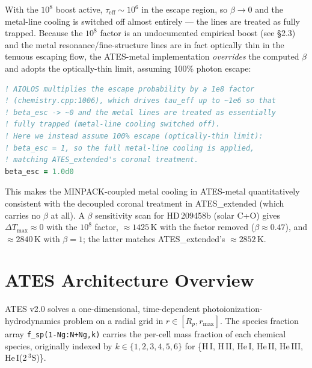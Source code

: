 \documentclass[english,a4paper]{kiseon_memo}
\begin{document}
With the \(10^{8}\) boost active, \(\tau_\mathrm{eff}\sim 10^{6}\) in the
escape region, so \(\beta\to 0\) and the metal-line cooling is switched
off almost entirely --- the lines are treated as fully trapped.  Because
the \(10^{8}\) factor is an undocumented empirical boost (see \S2.3) and
the metal resonance/fine-structure lines are in fact optically thin in
the tenuous escaping flow, the ATES-metal implementation
\emph{overrides} the computed \(\beta\) and adopts the optically-thin
limit, assuming 100\% photon escape:
\begin{lstlisting}[language=Fortran]
! AIOLOS multiplies the escape probability by a 1e8 factor
! (chemistry.cpp:1006), which drives tau_eff up to ~1e6 so that
! beta_esc -> ~0 and the metal lines are treated as essentially
! fully trapped (metal-line cooling switched off).
! Here we instead assume 100% escape (optically-thin limit):
! beta_esc = 1, so the full metal-line cooling is applied,
! matching ATES_extended's coronal treatment.
beta_esc = 1.0d0
\end{lstlisting}
This makes the MINPACK-coupled metal cooling in ATES-metal
quantitatively consistent with the decoupled coronal treatment in
ATES\_extended (which carries no \(\beta\) at all).  A \(\beta\)
sensitivity scan for HD\,209458b (solar C+O) gives
\(\Delta T_\mathrm{max}\approx 0\) with the \(10^{8}\) factor,
\(\approx 1425\)\,K with the factor removed (\(\beta\approx 0.47\)), and
\(\approx 2840\)\,K with \(\beta = 1\); the latter matches
ATES\_extended's \(\approx 2852\)\,K.

\section{ATES Architecture Overview}

ATES v2.0 solves a one-dimensional, time-dependent
photoionization-hydrodynamics problem on a radial grid in
\(r \in [R_p, r_\mathrm{max}]\).  The species fraction array
\texttt{f\_sp(1-Ng:N+Ng,k)} carries the per-cell mass fraction of each
chemical species, originally indexed by
\(k \in \{1,2,3,4,5,6\}\) for
\{H\,I, H\,II, He\,I, He\,II, He\,III, He\,I(2\,\(^3\!\mathrm{S}\))\}.
\end{document}
